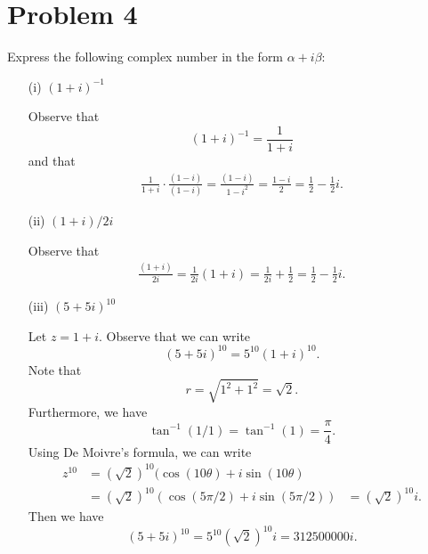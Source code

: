 \documentclass[a4paper]{article}
\begin{document}
    \section*{Problem 4} Express the following complex number in the form \( \alpha + i \beta  \):
        \begin{enumerate}
            \item[(i)] \( (1 + i)^{-1} \)
                \begin{solution}
                   Observe that  
                   \[  (1 + i)^{-1} = \frac{ 1 }{  1 + i }  \]
                   and that 
                   \begin{align*}
                      \frac{ 1 }{  1 + i  }  \cdot \frac{ (1 - i)  }{  (1- i) } = \frac{ (1- i) }{ 1 - i^{2} } = \frac{ 1 - i  }{ 2 } = \frac{ 1 }{ 2 }  - \frac{ 1 }{ 2 }  i.
                   \end{align*}
                \end{solution}
            \item[(ii)] \( (1 + i) / 2i \)
                \begin{solution}
                 Observe that    
                 \begin{align*}
                     \frac{ (1 + i) }{ 2i  }  = \frac{ 1 }{ 2i }  (1 + i) = \frac{ 1 }{ 2i }  + \frac{ 1 }{ 2 } = \frac{ 1 }{ 2 }  - \frac{ 1 }{ 2 }  i.  
                 \end{align*}
                \end{solution}
            \item[(iii)] \( (5 + 5i)^{10} \)
                \begin{solution}
                 Let \( z = 1 + i \). Observe that we can write   
                 \[  (5 + 5i)^{10} = 5^{10} (1 + i)^{10}. \]
                 Note that  
                 \[  r = \sqrt{ 1^{2} + 1^{2} }  = \sqrt{ 2 }. \]
                 Furthermore, we have
                 \[  \tan^{-1}(  1 / 1  ) = \tan^{-1}(1) = \frac{ \pi  }{ 4 }. \]
                 Using De Moivre's formula, we can write
                 \begin{align*}
                     z^{10} &= (\sqrt{ 2 })^{10}  (\cos(10 \theta ) + i \sin(10 \theta) \\
                           &=  (\sqrt{ 2 } )^{10} (\cos(5 \pi / 2 ) + i \sin( 5 \pi / 2))
                           &= (\sqrt{ 2 } )^{10} i.
                \end{align*}
                Then we have
                \[  (5 + 5i)^{10} = 5^{10} (\sqrt{ 2 } )^{10} i = 312500000 i. \]

\end{solution}
\end{enumerate}
\end{document}
